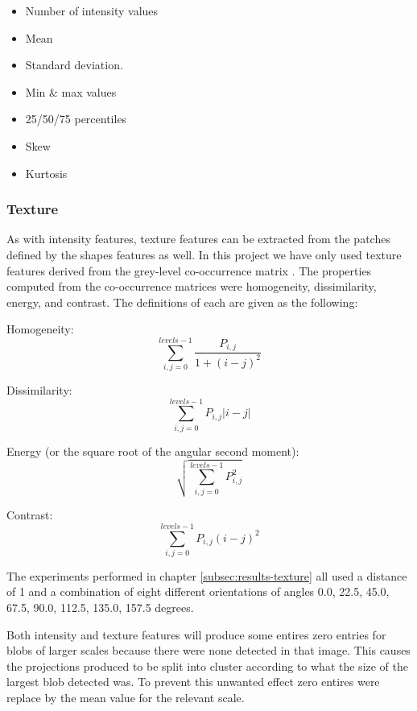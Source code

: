 \begin{itemize}
	\item Number of intensity values
	\item Mean
	\item Standard deviation.
	\item Min \& max values
	\item 25/50/75 percentiles
	\item Skew
	\item Kurtosis
\end{itemize}

\subsubsection{Texture}
As with intensity features, texture features can be extracted from the patches defined by the shapes features as well. In this project we have only used texture features derived from the grey-level co-occurrence matrix \cite{haralick1973textural}. The properties computed from the co-occurrence matrices were homogeneity, dissimilarity, energy, and contrast. The definitions of each are given as the following:

Homogeneity:
\begin{equation}
	\sum\limits_{i,j=0}^{levels-1} \frac{P_{i,j}}{1+(i-j)^2}
\end{equation}

Dissimilarity:
\begin{equation}
	\sum\limits_{i,j=0}^{levels-1} P_{i,j}|i-j|
\end{equation}

Energy (or the square root of the angular second moment):
\begin{equation}
	\sqrt{ \sum\limits_{i,j=0}^{levels-1} P_{i,j}^2 }
\end{equation}

Contrast:
\begin{equation}
	\sum\limits_{i,j=0}^{levels-1} P_{i,j}(i-j)^2
\end{equation}

The experiments performed in chapter \ref{subsec:results-texture} all used a distance of 1 and a combination of eight different orientations of angles 0.0, 22.5, 45.0, 67.5, 90.0, 112.5, 135.0, 157.5 degrees.

Both intensity and texture features will produce some entires zero entries for blobs of larger scales because there were none detected in that image. This causes the projections produced to be split into cluster according to what the size of the largest blob detected was. To prevent this unwanted effect zero entires were replace by the mean value for the relevant scale.

